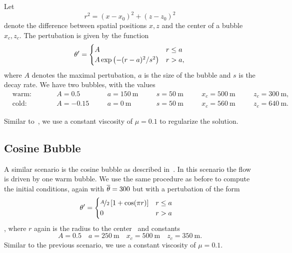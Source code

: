 Let
\begin{equation}
  \label{eq:radius}
  r^2 = (x - x_0)^2 + (z - z_0)^2
\end{equation}
denote the difference between spatial positions $x,z$ and the center of a bubble $x_c, z_c$.
The pertubation is given by the function
\begin{equation}
  \label{eq:bubbles-pertubation}
  \theta' =
  \begin{cases}
    A & r \leq a \\
    A \exp \left( - (r-a)^2/s^2 \right) & r > a,
    \end{cases}
\end{equation}
where $A$ denotes the maximal pertubation, $a$ is the size of the bubble and $s$ is the decay rate.
We have two bubbles, with the values
\begin{equation}
  \label{eq:bubbles-values}
\begin{alignedat}{6}
  & \text{warm:} \qquad && A = 0.5 \quad&& a = \SI{150}{\m} \quad&& s = \SI{50}{\m} \quad&& x_c = \SI{500}{\m} \quad&& z_c = \SI{300}{\m},\\
  & \text{cold:} \qquad && A = -0.15 \quad&& a = \SI{0}{\m} \quad&& s = \SI{50}{\m} \quad&& x_c = \SI{560}{\m} \quad&& z_c = \SI{640}{\m}.
  \end{alignedat}
\end{equation}

Similar to~\cite{muller2010adaptive}, we use a constant viscosity of $\mu = 0.1$ to regularize the solution.

\subsection{Cosine Bubble}
A similar scenario is the cosine bubble as described in~\cite{giraldo2008study}.
In this scenario the flow is driven by one warm bubble.
We use the same procedure as before to compute the initial conditions, again with $\overline{\theta} = 300$ but with a pertubation of the form
\begin{align}
  \label{eq:cos-pertubation}
  \theta' &= \begin{cases}
    \nicefrac{A}{2} \left[ 1 + \cos(\pi r) \right] & r \leq a \\
    0 & r > a
    \end{cases}
\end{align},
where $r$ again is the radius to the center~ and constants
\begin{equation}\label{eq:density-bubble}
  A = 0.5 \quad a = \SI{250}{\m} \quad x_c = \SI{500}{\m} \quad z_c = \SI{350}{\m}.
\end{equation}
Similar to the previous scenario, we use a constant viscosity of $\mu = 0.1$.

